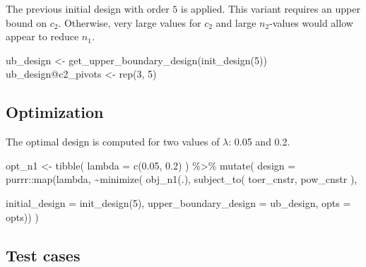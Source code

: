 \documentclass[
]{book}
\newenvironment{Shaded}{\begin{snugshade}}{\end{snugshade}}
\newcommand{\AttributeTok}[1]{\textcolor[rgb]{0.77,0.63,0.00}{#1}}
\newcommand{\DecValTok}[1]{\textcolor[rgb]{0.00,0.00,0.81}{#1}}
\newcommand{\FloatTok}[1]{\textcolor[rgb]{0.00,0.00,0.81}{#1}}
\newcommand{\FunctionTok}[1]{\textcolor[rgb]{0.00,0.00,0.00}{#1}}
\newcommand{\NormalTok}[1]{#1}
\newcommand{\OtherTok}[1]{\textcolor[rgb]{0.56,0.35,0.01}{#1}}
\newcommand{\SpecialCharTok}[1]{\textcolor[rgb]{0.00,0.00,0.00}{#1}}
\begin{document}
The previous initial design with order \(5\) is applied.
This variant requires an upper bound on \(c_2\).
Otherwise, very large values for \(c_2\) and large \(n_2\)-values would allow
appear to reduce \(n_1\).

\begin{Shaded}
\begin{Highlighting}[]
\NormalTok{ub\_design }\OtherTok{\textless{}{-}} \FunctionTok{get\_upper\_boundary\_design}\NormalTok{(}\FunctionTok{init\_design}\NormalTok{(}\DecValTok{5}\NormalTok{))}
\NormalTok{ub\_design}\SpecialCharTok{@}\NormalTok{c2\_pivots }\OtherTok{\textless{}{-}} \FunctionTok{rep}\NormalTok{(}\DecValTok{3}\NormalTok{, }\DecValTok{5}\NormalTok{)}
\end{Highlighting}
\end{Shaded}

\hypertarget{optimization-11}{%
\subsection{Optimization}\label{optimization-11}}

The optimal design is computed for two values of \(\lambda\): 0.05 and 0.2.

\begin{Shaded}
\begin{Highlighting}[]
\NormalTok{opt\_n1 }\OtherTok{\textless{}{-}} \FunctionTok{tibble}\NormalTok{(}
  \AttributeTok{lambda =} \FunctionTok{c}\NormalTok{(}\FloatTok{0.05}\NormalTok{, }\FloatTok{0.2}\NormalTok{)}
\NormalTok{) }\SpecialCharTok{\%\textgreater{}\%}
  \FunctionTok{mutate}\NormalTok{(}
    \AttributeTok{design =}\NormalTok{ purrr}\SpecialCharTok{::}\FunctionTok{map}\NormalTok{(lambda, }\SpecialCharTok{\textasciitilde{}}\FunctionTok{minimize}\NormalTok{(}
          \FunctionTok{obj\_n1}\NormalTok{(.),}
          \FunctionTok{subject\_to}\NormalTok{(}
\NormalTok{              toer\_cnstr,}
\NormalTok{              pow\_cnstr}
\NormalTok{          ),}
          
          \AttributeTok{initial\_design        =} \FunctionTok{init\_design}\NormalTok{(}\DecValTok{5}\NormalTok{), }
          \AttributeTok{upper\_boundary\_design =}\NormalTok{ ub\_design,}
          \AttributeTok{opts                  =}\NormalTok{ opts)) }
\NormalTok{)}
\end{Highlighting}
\end{Shaded}

\hypertarget{test-cases-12}{%
\subsection{Test cases}\label{test-cases-12}}
\end{document}
